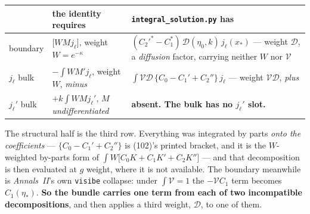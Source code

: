 \begin{center}\small
\begin{tabularx}{\textwidth}{@{}l >{\raggedright\arraybackslash}X >{\raggedright\arraybackslash}X@{}}
\toprule
 & \textbf{the identity requires} & \textbf{\texttt{integral\_solution.py} has} \\
\midrule
boundary & $\bigl[W M j_\ell\bigr]$, weight $W=e^{-\kappa}$ &
  $(C_2'^{*}-C_1^{*})\,\mathcal D(\eta_0,k)\,j_\ell(x_*)$ --- weight
  $\mathcal D$, a \emph{diffusion} factor, carrying neither $W$ nor
  $\mathcal V$ \\[2pt]
$j_\ell$ bulk & $-\int W M' j_\ell$, weight $W$, \emph{minus} &
  $\int \mathcal V\mathcal D\,\{C_0-C_1'+C_2''\}\,j_\ell$ --- weight
  $\mathcal V\mathcal D$, \emph{plus} \\[2pt]
$j_\ell'$ bulk & $+k\int W M j_\ell'$, $M$ \emph{undifferentiated} &
  \textbf{absent. The bulk has no $j_\ell'$ slot.} \\
\bottomrule
\end{tabularx}
\end{center}

\noindent
The structural half is the third row. Everything was integrated by parts
\emph{onto the coefficients} --- $\{C_0-C_1'+C_2''\}$ is (102)'s printed
bracket, and it is the $W$-weighted by-parts form of
$\int W\bigl[C_0K+C_1K'+C_2K''\bigr]$ --- and that decomposition is then
evaluated at $g$ weight, where it is not available. The boundary meanwhile is
\emph{Annals~II}'s own \texttt{visibe} collapse: under $\int\mathcal V=1$ the
$-\mathcal V C_1$ term becomes $C_1(\eta_*)$. \textbf{So the bundle carries one
term from each of two incompatible decompositions}, and then applies a third
weight, $\mathcal D$, to one of them.

